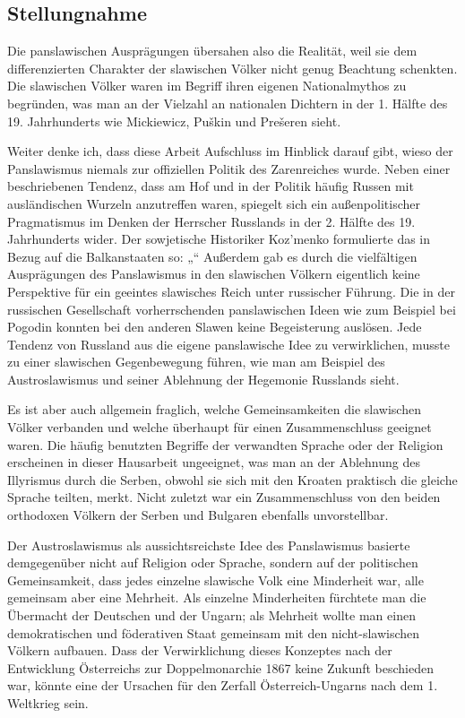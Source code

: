 \documentclass{../../sem_paper}
\begin{document}
\subsection*{Stellungnahme}
Die panslawischen Ausprägungen übersahen also die Realität, weil sie dem differenzierten
Charakter der slawischen Völker nicht genug Beachtung schenkten. Die slawischen Völker
waren im Begriff ihren eigenen Nationalmythos zu begründen, was man an der Vielzahl an
nationalen Dichtern in der 1. Hälfte des 19. Jahrhunderts wie Mickiewicz, Puškin und
Prešeren sieht.

Weiter denke ich, dass diese Arbeit Aufschluss im Hinblick darauf gibt, wieso der
Panslawismus niemals zur offiziellen Politik des Zarenreiches wurde. Neben einer
beschriebenen Tendenz, dass am Hof und in der Politik häufig Russen mit ausländischen
Wurzeln anzutreffen waren, spiegelt sich ein außenpolitischer Pragmatismus im Denken der
Herrscher Russlands in der 2. Hälfte des 19. Jahrhunderts wider. Der sowjetische Historiker Koz'menko\autocite[191]{kozmenko}
formulierte das in Bezug auf die Balkanstaaten so: „“ Außerdem gab es durch die vielfältigen Ausprägungen des Panslawismus
in den slawischen Völkern eigentlich keine Perspektive für ein geeintes slawisches Reich
unter russischer Führung. Die in der russischen Gesellschaft vorherrschenden panslawischen
Ideen wie zum Beispiel bei Pogodin konnten bei den anderen Slawen keine Begeisterung
auslösen. Jede Tendenz von Russland aus die eigene panslawische Idee zu verwirklichen,
musste zu einer slawischen Gegenbewegung führen, wie man am Beispiel des
Austroslawismus und seiner Ablehnung der Hegemonie Russlands sieht.

Es ist aber auch allgemein fraglich, welche Gemeinsamkeiten die slawischen Völker
verbanden und welche überhaupt für einen Zusammenschluss geeignet waren. Die häufig
benutzten Begriffe der verwandten Sprache oder der Religion erscheinen in dieser Hausarbeit
ungeeignet, was man an der Ablehnung des Illyrismus durch die Serben, obwohl sie sich mit
den Kroaten praktisch die gleiche Sprache teilten, merkt. Nicht zuletzt war ein
Zusammenschluss von den beiden orthodoxen Völkern der Serben und Bulgaren ebenfalls
unvorstellbar.

Der Austroslawismus als aussichtsreichste Idee des Panslawismus basierte demgegenüber
nicht auf Religion oder Sprache, sondern auf der politischen Gemeinsamkeit, dass jedes
einzelne slawische Volk eine Minderheit war, alle gemeinsam aber eine Mehrheit. Als
einzelne Minderheiten fürchtete man die Übermacht der Deutschen und der Ungarn; als
Mehrheit wollte man einen demokratischen und föderativen Staat gemeinsam mit den nicht-slawischen Völkern aufbauen. Dass der Verwirklichung dieses Konzeptes nach der
Entwicklung Österreichs zur Doppelmonarchie 1867 keine Zukunft beschieden war, könnte
eine der Ursachen für den Zerfall Österreich-Ungarns nach dem 1. Weltkrieg sein.
\end{document}
